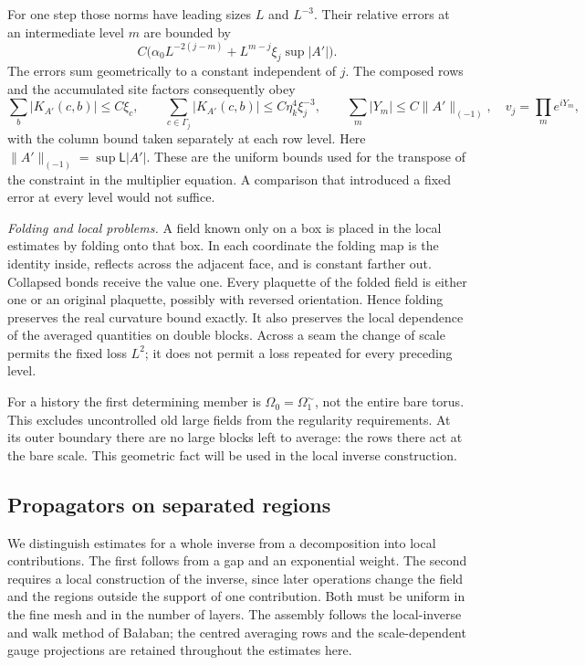 \documentclass[11pt,letterpaper,reqno]{amsart}
\theoremstyle{definition}
\theoremstyle{remark}
\begin{document}
For one step those norms have leading sizes $L$ and $L^{-3}$.
Their relative errors at an intermediate level $m$ are bounded
by
\[
 C\big(\alpha_0L^{-2(j-m)}
             +L^{m-j}\xi_j\sup|A'|\big).
\]
The errors sum geometrically to a constant independent of $j$.
The composed rows and the accumulated site factors consequently
obey
\[
 \sum_b|K_{A'}(c,b)|\le C\xi_c,\qquad
 \sum_{c\in\Gamma_j}|K_{A'}(c,b)|\le C\eta_k^4\xi_j^{-3},\qquad
 \sum_m|Y_m|\le C\|A'\|_{(-1)},\quad v_j=\prod_me^{iY_m},
\]
with the column bound taken separately at each row level.
Here $\|A'\|_{(-1)}=\sup\mathsf L|A'|$.
These are the uniform bounds used for the transpose of
the constraint in the multiplier equation. A comparison that
introduced a fixed error at every level would not suffice.

\emph{Folding and local problems.}
A field known only on a box is placed in the local estimates
by folding onto that box. In each coordinate the folding map
is the identity inside, reflects across the adjacent face, and
is constant farther out. Collapsed bonds receive the value one.
Every plaquette of the folded field is either one or an original
plaquette, possibly with reversed orientation. Hence folding
preserves the real curvature bound exactly. It also preserves
the local dependence of the averaged quantities on double blocks.
Across a seam the change of scale permits the fixed loss $L^2$;
it does not permit a loss repeated for every preceding level.

For a history the first determining member is
$\Omega_0=\Omega_1^{\sim}$, not the entire bare torus. This
excludes uncontrolled old large fields from the regularity
requirements. At its outer boundary there are no large blocks
left to average: the rows there act at the bare scale. This
geometric fact will be used in the local inverse construction.

\subsection{Propagators on separated regions}

We distinguish estimates for a whole inverse from a decomposition
into local contributions. The first follows from a gap and an
exponential weight. The second requires a local construction of
the inverse, since later operations change the field and the
regions outside the support of one contribution. Both must be
uniform in the fine mesh and in the number of layers.
The assembly follows the local-inverse and walk method of
Ba\l aban\cite{Balaban1984,Balaban1985}; the centred averaging
rows and the scale-dependent gauge projections are retained
throughout the estimates here.
\end{document}
